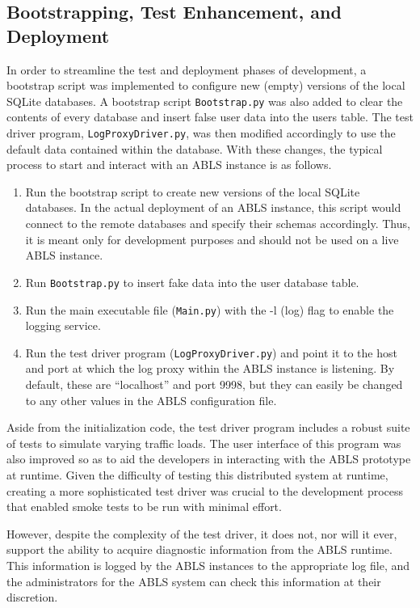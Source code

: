 \documentclass{sig-alternate}
\begin{document}
\subsection{Bootstrapping, Test Enhancement, and Deployment}
In order to streamline the test and deployment phases of development, a bootstrap script was implemented to configure
new (empty) versions of the local SQLite databases. A bootstrap script {\tt Bootstrap.py} was also added to clear the 
contents of every database and insert false user data into the users table. 
The test driver program, {\tt LogProxyDriver.py}, was then modified accordingly to use the default data contained within the 
database. With these changes, the typical process to start and interact with an ABLS instance is as follows.

\begin{enumerate}
	\item Run the bootstrap script to create new versions of the local SQLite databases. In the actual deployment of an ABLS instance, this script would connect to the remote databases and specify their schemas accordingly. Thus, it is meant only for development purposes and should not be used on a live ABLS instance.
	\item Run {\tt Bootstrap.py} to insert fake data into the user database table.
	\item Run the main executable file ({\tt Main.py}) with the -l (log) flag to enable the logging service.	
	\item Run the test driver program ({\tt LogProxyDriver.py}) and point it to the host and port at which the log proxy within the ABLS instance is listening. By default, these are ``localhost'' and port 9998, but they can easily be changed to any other values in the ABLS configuration file. 
\end{enumerate}

Aside from the initialization code, the test driver program includes a robust suite of tests to simulate varying traffic 
loads. The user interface of this program was also improved so as to aid the developers in interacting with the ABLS 
prototype at runtime. Given the difficulty of testing this distributed system at runtime, creating a more sophisticated
test driver was crucial to the development process that enabled smoke tests to be run with minimal effort.

However, despite the complexity of the test driver, it does not, nor will it ever, support the ability to acquire 
diagnostic information from the ABLS runtime. This information is logged by the ABLS instances to the appropriate log 
file, and the administrators for the ABLS system can check this information at their discretion.
\end{document}
